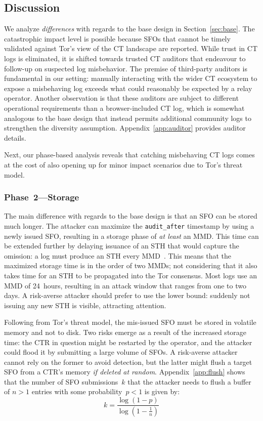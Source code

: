 \subsection{Discussion} \label{sec:auditor:analysis}
We analyze \emph{differences} with regards to the base design in
Section~\ref{sec:base}.  The catastrophic impact level is possible because SFOs
that cannot be timely validated against Tor's view of the CT landscape are
reported.  While trust in CT logs is eliminated, it is shifted towards
trusted CT auditors that endeavour to follow-up on suspected log misbehavior.
The premise of third-party auditors is fundamental in our setting:
	manually interacting with the wider CT ecosystem to expose a misbehaving
		log exceeds what could reasonably be expected by a relay operator.
Another observation is that these auditors are subject to different operational
requirements than a browser-included CT log, which is somewhat analogous to the
base design that instead permits additional community logs to strengthen the
diversity assumption.  Appendix~\ref{app:auditor} provides auditor details.

Next, our phase-based analysis reveals that catching misbehaving CT logs comes
at the cost of also opening up for minor impact scenarios due to Tor's threat
model.

\subsubsection{Phase~2---Storage} \label{sec:auditor:analysis:phase2}
The main difference with regards to the base design is that an SFO can be
stored much longer.  The attacker can maximize the \texttt{audit\_after}
timestamp by using a newly issued SFO, resulting in a storage phase of \emph{at
least} an MMD.  This time can be extended further by delaying issuance of an
STH that would capture the omission:
	a log must produce an STH every MMD~\cite{ct,ct/bis}.
This means that the maximized storage time is in the order of two MMDs; not
considering that it also takes time for an STH to be propagated into the Tor
consensus.  Most logs use an MMD of 24~hours, resulting in an attack window that
ranges from one to two days.  A risk-averse attacker should prefer to use the
lower bound:
	suddenly not issuing any new STH is visible, attracting attention.

Following from Tor's threat model, the mis-issued SFO must be stored in
volatile memory and not to disk.  Two risks emerge as a result of the increased
storage time:
	the CTR in question might be restarted by the operator,
	and the attacker could flood it by submitting a large volume of SFOs.
A risk-averse attacker cannot rely on the former to avoid detection, but the
latter might flush a target SFO from a CTR's memory \emph{if deleted at random}.
Appendix~\ref{app:flush} shows that the number of SFO submissions~$k$ that the
attacker needs to flush a buffer of $n>1$ entries with some probability~$p<1$ is
given by:
\begin{equation} \label{eq:flush}
	k = \frac{\log(1-p)}{\log(1 - \frac{1}{n})}
\end{equation}

